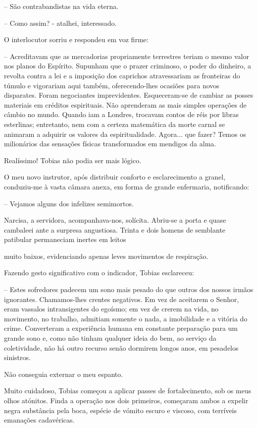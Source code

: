 \documentclass[portuguese,12pt,a4paper]{scrbook}
\begin{document}
	– São contrabandistas na vida eterna.
	
	– Como assim? - atalhei, interessado.
	
	O interlocutor sorriu e respondeu em voz firme:
	
	– Acreditavam que as mercadorias propriamente terrestres teriam o mesmo valor nos planos do Espírito. Supunham que o prazer criminoso, o poder do dinheiro, a revolta contra a lei e a imposição dos caprichos atravessariam as fronteiras do túmulo e vigorariam aqui também, oferecendo-lhes ocasiões para novos disparates. Foram negociantes imprevidentes. Esqueceram-se de cambiar as posses materiais em créditos espirituais. Não aprenderam as mais simples operações de câmbio no mundo. Quando iam a Londres, trocavam contos de réis por libras esterlinas; entretanto, nem com a certeza matemática da morte carnal se animaram a adquirir os valores da espiritualidade. Agora... que fazer? Temos os milionários das sensações físicas transformados em mendigos da alma.
	
	Realíssimo! Tobias não podia ser mais lógico.
	
	O meu novo instrutor, após distribuir conforto e esclarecimento a granel, conduziu-me à vasta câmara anexa, em forma de grande enfermaria, notificando:
	
	– Vejamos alguns dos infelizes semimortos.
	
	Narcisa, a servidora, acompanhava-nos, solícita. Abriu-se a porta e quase cambaleei ante a surpresa angustiosa. Trinta e dois homens de semblante patibular permaneciam inertes em leitos
	
	
	muito baixos, evidenciando apenas leves movimentos de respiração.
	
	Fazendo gesto significativo com o indicador, Tobias esclareceu:
	
	– Estes sofredores padecem um sono mais pesado do que outros dos nossos irmãos ignorantes. Chamamos-lhes crentes negativos. Em vez de aceitarem o Senhor, eram vassalos intransigentes do egoísmo; em vez de crerem na vida, no movimento, no trabalho, admitiam somente o nada, a imobilidade e a vitória do crime. Converteram a experiência humana em constante preparação para um grande sono e, como não tinham qualquer ideia do bem, ao serviço da coletividade, não há outro recurso senão dormirem longos anos, em pesadelos sinistros.
	
	Não conseguia externar o meu espanto.
	
	Muito cuidadoso, Tobias começou a aplicar passes de fortalecimento, sob os meus olhos atónitos. Finda a operação nos dois primeiros, começaram ambos a expelir negra substância pela boca, espécie de vómito escuro e viscoso, com terríveis emanações cadavéricas.
	
\end{document}
